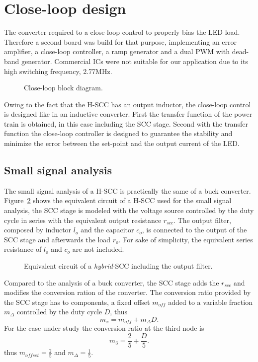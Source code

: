 \section{Close-loop design}
The converter required to a close-loop control to properly bias the LED load.  Therefore a second board was build for that purpose, implementing an error amplifier, a close-loop controller, a ramp generator and a dual PWM with dead-band generator. Commercial ICs were not suitable for our application due to its high switching frequency, 2.77MHz.
\begin{figure}[!h]
    \centering
    
    \caption[]{Close-loop block diagram.}
    \label{fig:close_loop_diagram}
\end{figure}

Owing to the fact that the H-SCC has an output inductor, the close-loop control is designed like in an inductive converter. First the transfer function of the power train is obtained, in this case including the SCC stage. Second with the transfer function the close-loop controller is designed to guarantee the stability and minimize the error between the set-point and the output current of the LED.

\subsection{Small signal analysis}

The small signal analysis of a H-SCC is practically the same of a buck converter. Figure~\ref{fig:small_signal_hscc} shows the equivalent circuit of a H-SCC used for the small signal analysis, the SCC stage is modeled with the voltage source controlled by the duty cycle in series with the equivalent output resistance $r_{scc}$. The output filter, composed by inductor $l_o$ and the capacitor $c_o$, is connected to the output of the SCC stage and afterwards the load $r_o$. For sake of simplicity, the equivalent series resistance of $l_o$ and $c_o$ are not included.   
\begin{figure}[!h]
    \centering
    
    \caption[]{Equivalent circuit of a \emph{hybrid}-SCC including the output filter.}
    \label{fig:small_signal_hscc}
\end{figure}

Compared to the analysis of a buck converter, the SCC stage adds the $r_{scc}$ and modifies the conversion ration of the converter. The conversion ratio provided by the SCC stage has to components, a fixed offset $m_{off}$ added to a variable fraction $m_{\Delta}$ controlled by the duty cycle $D$, thus
\begin{equation}
 m_{x}  = m_{off} + m_{\Delta}D.
\label{eq:m_ratio}
\end{equation}
For the case under study the conversion ratio at the third node is 
\begin{equation}
 m_{3}  = \frac{2}{5} + \frac{D}{5}.
\label{eq:m3_ratio}
\end{equation}
thus $m_{offset} = \frac{2}{5}$ and $m_{\Delta}=\frac{1}{5}$.
 
